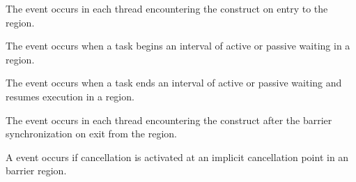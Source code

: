 \def\omptSyncRegion#1{
\events
The \plc{#1-begin} event occurs in each thread encountering the
\code{#1} construct on entry to the \code{#1} region.

The \plc{#1-wait-begin} event occurs when a task begins an interval of active or passive waiting
in a \code{#1} region.

The \plc{#1-wait-end} event occurs when a task ends an interval of active or passive waiting
and resumes execution in a \code{#1} region.

The \plc{#1-end} event occurs in each thread encountering the
\code{#1} construct after the #1 synchronization on exit from the
\code{#1} region.
\tools
A thread dispatches a registered \code{ompt_callback_sync_region}
callback for each occurrence of a \plc{#1-begin} and \plc{#1-end} event
in that thread.  The callback occurs in the task encountering
the #1 construct.  This callback has the type signature
\code{ompt_callback_sync_region_t}.
The callback receives
\code{ompt_sync_region_#1} as its \plc{kind} argument and
\code{ompt_scope_begin} or \code{ompt_scope_end}
as its \plc{endpoint} argument, as appropriate.

A thread dispatches a registered
\code{ompt_callback_sync_region_wait} callback
for each occurrence of a \plc{#1-wait-begin} and \plc{#1-wait-end} event.
This callback has type signature \code{ompt_callback_sync_region_t}.
This callback executes in the context of the task that encountered the
\code{#1} construct. The callback receives
\code{ompt_sync_region_#1} as its \plc{kind} argument and
\code{ompt_scope_begin} or \code{ompt_scope_end}
as its \plc{endpoint} argument, as appropriate.
}

\events
The  event occurs in each thread encountering the
 construct on entry to the  region.

The  event occurs when a task begins an interval of active or passive waiting
in a  region.

The  event occurs when a task ends an interval of active or passive waiting
and resumes execution in a  region.

The  event occurs in each thread encountering the
 construct after the barrier synchronization on exit from the
 region.

A  event occurs if cancellation is activated at an implicit cancellation point in an barrier region.

